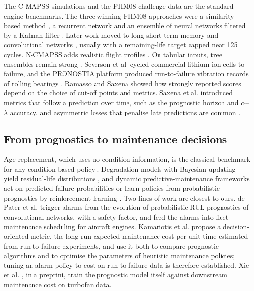 \documentclass[a4paper,fleqn,doubleblind]{cas-dc}
\begin{document}
The C-MAPSS simulations and the PHM08 challenge data \cite{saxena2008} are the standard engine benchmarks. The three winning PHM08 approaches were a similarity-based method \cite{wang2008}, a recurrent network \cite{heimes2008} and an ensemble of neural networks filtered by a Kalman filter \cite{peel2008}. Later work moved to long short-term memory \cite{zheng2017} and convolutional networks \cite{li2018}, usually with a remaining-life target capped near 125 cycles. N-CMAPSS adds realistic flight profiles \cite{ariaschao2021}. On tabular inputs, tree ensembles remain strong \cite{grinsztajn2022,friedman2001}. Severson et al. \cite{severson2019} cycled commercial lithium-ion cells to failure, and the PRONOSTIA platform produced run-to-failure vibration records of rolling bearings \cite{nectoux2012}. Ramasso and Saxena \cite{ramasso2014} showed how strongly reported scores depend on the choice of cut-off points and metrics. Saxena et al. \cite{saxena2010} introduced metrics that follow a prediction over time, such as the prognostic horizon and $\alpha$--$\lambda$ accuracy, and asymmetric losses that penalise late predictions are common \cite{rengasamy2020}.

\subsection{From prognostics to maintenance decisions}

Age replacement, which uses no condition information, is the classical benchmark for any condition-based policy \cite{barlow1960,dejonge2020}. Degradation models with Bayesian updating yield residual-life distributions \cite{gebraeel2005}, and dynamic predictive-maintenance frameworks act on predicted failure probabilities \cite{nguyen2019,mitici2023} or learn policies from probabilistic prognostics by reinforcement learning \cite{lee2023}. Two lines of work are closest to ours. de Pater et al. \cite{depater2022} trigger alarms from the evolution of probabilistic RUL prognostics of convolutional networks, with a safety factor, and feed the alarms into fleet maintenance scheduling for aircraft engines. Kamariotis et al. \cite{kamariotis2024} propose a decision-oriented metric, the long-run expected maintenance cost per unit time estimated from run-to-failure experiments, and use it both to compare prognostic algorithms and to optimise the parameters of heuristic maintenance policies; tuning an alarm policy to cost on run-to-failure data is therefore established. Xie et al. \cite{xie2025}, in a preprint, train the prognostic model itself against downstream maintenance cost on turbofan data.
\end{document}
